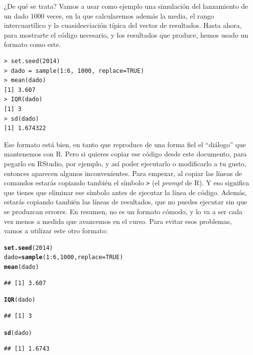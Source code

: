 \documentclass[10pt,a4paper]{article}\usepackage[]{graphicx}\usepackage[]{color}
\makeatletter
\newcommand{\hlnum}[1]{\textcolor[rgb]{0.686,0.059,0.569}{#1}}%
\newcommand{\hlopt}[1]{\textcolor[rgb]{0,0,0}{#1}}%
\newcommand{\hlstd}[1]{\textcolor[rgb]{0.345,0.345,0.345}{#1}}%
\newcommand{\hlkwb}[1]{\textcolor[rgb]{0.69,0.353,0.396}{#1}}%
\newcommand{\hlkwc}[1]{\textcolor[rgb]{0.333,0.667,0.333}{#1}}%
\newcommand{\hlkwd}[1]{\textcolor[rgb]{0.737,0.353,0.396}{\textbf{#1}}}%
\newenvironment{kframe}{%
 \def\at@end@of@kframe{}%
 \ifinner\ifhmode%
  \def\at@end@of@kframe{\end{minipage}}%
  \begin{minipage}{\columnwidth}%
 \fi\fi%
 \def\FrameCommand##1{\hskip\@totalleftmargin \hskip-\fboxsep
 \colorbox{shadecolor}{##1}\hskip-\fboxsep
     \hskip-\linewidth \hskip-\@totalleftmargin \hskip\columnwidth}%
 \MakeFramed {\advance\hsize-\width
   \@totalleftmargin\z@ \linewidth\hsize
   \@setminipage}}%
 {\par\unskip\endMakeFramed%
 \at@end@of@kframe}
\newenvironment{knitrout}{}{} %
\makeatother
\begin{document}
¿De qué se trata? Vamos a usar como ejemplo una simulación del lanzamiento de un dado $1000$ veces, en la que calcularemos además la media, el rango intercuartílico y la cuasidesviación típica del vector de resultados. Hasta ahora, para mostrarte el código necesario, y los resultados que produce, hemos usado un formato como este.
\begin{verbatim}
> set.seed(2014)
> dado = sample(1:6, 1000, replace=TRUE)
> mean(dado)
[1] 3.607
> IQR(dado)
[1] 3
> sd(dado)
[1] 1.674322
\end{verbatim}
Ese formato está bien, en tanto que reproduce de una forma fiel el ``diálogo'' que mantenemos con R. Pero si quieres copiar ese código desde este documento, para pegarlo en RStudio, por ejemplo, y así poder ejecutarlo o modificarlo a tu gusto, entonces aparecen algunos inconvenientes. Para empezar, al copiar las líneas de comandos estarás copiando también el símbolo {\tt >} (el {\em prompt} de R). Y eso significa que tienes que eliminar ese símbolo antes de ejecutar la línea de código. Además, estarás copiando también las líneas de resultados, que no puedes ejecutar sin que se produzcan errores. En resumen, no es un formato cómodo, y lo va a ser cada vez menos a medida que avancemos en el curso. Para evitar esos problemas, vamos a utilizar este otro formato:
\begin{knitrout}
\color{fgcolor}\begin{kframe}
\begin{alltt}
\hlkwd{set.seed}\hlstd{(}\hlnum{2014}\hlstd{)}
\hlstd{dado} \hlkwb{=} \hlkwd{sample}\hlstd{(}\hlnum{1}\hlopt{:}\hlnum{6}\hlstd{,} \hlnum{1000}\hlstd{,} \hlkwc{replace}\hlstd{=}\hlnum{TRUE}\hlstd{)}
\hlkwd{mean}\hlstd{(dado)}
\end{alltt}
\begin{verbatim}
## [1] 3.607
\end{verbatim}
\begin{alltt}
\hlkwd{IQR}\hlstd{(dado)}
\end{alltt}
\begin{verbatim}
## [1] 3
\end{verbatim}
\begin{alltt}
\hlkwd{sd}\hlstd{(dado)}
\end{alltt}
\begin{verbatim}
## [1] 1.6743
\end{verbatim}
\end{kframe}
\end{knitrout}
\end{document}
